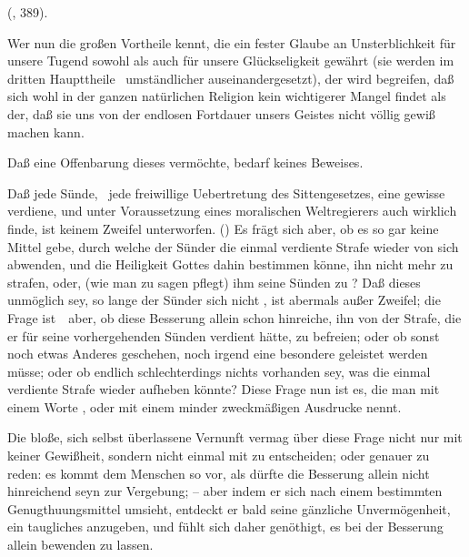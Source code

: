 \begin{aufza}
\begin{aufzb}
{ (, 389).}
\end{aufzb}
\item Wer nun die großen Vortheile kennt, die ein fester Glaube an Unsterblichkeit für unsere Tugend sowohl als auch für unsere Glückseligkeit gewährt (sie werden im dritten Haupttheile \ umständlicher auseinandergesetzt), der wird begreifen, daß sich wohl in der ganzen natürlichen Religion kein wichtigerer Mangel findet als der, daß sie uns von der endlosen Fortdauer unsers Geistes nicht völlig gewiß machen kann.
\item Daß eine Offenbarung dieses vermöchte, bedarf keines Beweises.
\end{aufza}

Daß jede Sünde, \dh\ jede freiwillige Uebertretung des Sittengesetzes, eine gewisse  verdiene, und unter Voraussetzung eines moralischen Weltregierers auch wirklich finde, ist keinem Zweifel unterworfen. () Es frägt sich aber, ob es so gar keine Mittel gebe, durch welche der Sünder die einmal verdiente Strafe wieder von sich abwenden, und die Heiligkeit Gottes dahin bestimmen könne, ihn nicht mehr zu strafen, oder, (wie man zu sagen pflegt) ihm seine Sünden zu ? Daß dieses unmöglich sey, so lange der Sünder sich nicht , ist abermals außer Zweifel; die Frage ist~\ aber, ob diese Besserung allein schon hinreiche, ihn von der Strafe, die er für seine vorhergehenden Sünden verdient hätte, zu befreien; oder ob sonst noch etwas Anderes geschehen, noch irgend eine besondere  geleistet werden müsse; oder ob endlich schlechterdings nichts vorhanden sey, was die einmal verdiente Strafe wieder aufheben könnte? Diese Frage nun ist es, die man mit einem Worte , oder mit einem minder zweckmäßigen Ausdrucke  nennt.\par
Die bloße, sich selbst überlassene Vernunft vermag über diese Frage nicht nur mit keiner Gewißheit, sondern nicht einmal mit  zu entscheiden; oder genauer zu reden: es kommt dem Menschen so vor, als dürfte die Besserung allein nicht hinreichend seyn zur Vergebung; -- aber indem er sich nach einem bestimmten Genugthuungsmittel umsieht, entdeckt er bald seine gänzliche Unvermögenheit, ein taugliches anzugeben, und fühlt sich daher genöthigt, es bei der Besserung allein bewenden zu lassen.

